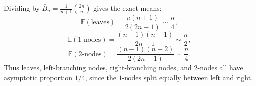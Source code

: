 Dividing by $\bar{B}_n = \frac{1}{n+1}\binom{2n}{n}$ gives the exact means:
\begin{equation*}
    \mathbb{E}(\text{leaves})
        = \frac{n(n+1)}{2(2n-1)} \sim \frac{n}{4},
\end{equation*}
\begin{equation*}
    \mathbb{E}(1\text{-nodes})
        = \frac{(n+1)(n-1)}{2n-1} \sim \frac{n}{2},
\end{equation*}
\begin{equation*}
    \mathbb{E}(2\text{-nodes})
        = \frac{(n-1)(n-2)}{2(2n-1)} \sim \frac{n}{4}.
\end{equation*}
Thus leaves, left-branching nodes, right-branching nodes, and $2$-nodes all have asymptotic
proportion $1/4$, since the $1$-nodes split equally between left and right.

